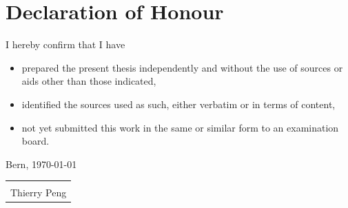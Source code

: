 \documentclass[a4paper,12pt]{article}
\begin{document}
    \section*{Declaration of Honour}

    I hereby confirm that I have
    \begin{itemize}
        \item prepared the present thesis independently and without the use of sources or aids other than those indicated,
        \item identified the sources used as such, either verbatim or in terms of content,
        \item not yet submitted this work in the same or similar form to an examination board.
    \end{itemize}
    Bern, \today\newline
    \newline
    \newline
    \newline
    \begin{tabular}{@{}p{5.0cm}@{}}
        \hrulefill \\
        Thierry Peng
    \end{tabular}

    \pagebreak

\end{document}
